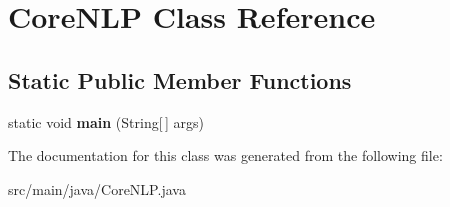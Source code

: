 \hypertarget{classCoreNLP}{}\section{Core\+N\+LP Class Reference}
\label{classCoreNLP}
\subsection*{Static Public Member Functions}
\begin{DoxyCompactItemize}
\item 
\mbox{\label{classCoreNLP_a698a5fab25ad16fd1c23297ad992a1b3}} 
static void {\bfseries main} (String\mbox{[}$\,$\mbox{]} args)
\end{DoxyCompactItemize}


The documentation for this class was generated from the following file\+:\begin{DoxyCompactItemize}
\item 
src/main/java/Core\+N\+L\+P.\+java\end{DoxyCompactItemize}
